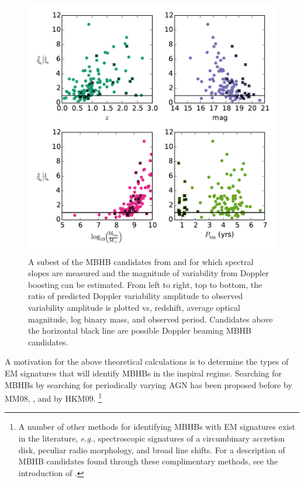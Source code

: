 \begin{figure}
\begin{center}
\includegraphics[scale=0.55]{figures/ch0/PTF_xsiGtr1_vs_z_M_P_alph_I90} 
\end{center}
\caption{A subest of the MBHB candidates from \citep{Graham+2015b} and \citep[][denoted by black x's]{Charisi+2016} for which spectral slopes are measured and the magnitude of variability from Doppler boosting can be estimated. From left to right, top to bottom, the ratio of predicted Doppler variability amplitude to observed variability amplitude is plotted vs, redshift, average optical magnitude, log binary mass, and observed period. Candidates above the horizontal black line are possible Doppler beaming MBHB candidates.}
\label{Fig:DopCan}
\end{figure}


A motivation for the above theoretical calculations is to
determine the types of EM signatures that will identify MBHBs in the inspiral
regime. Searching for MBHBs by searching for periodically varying AGN has been
proposed before by MM08, \cite{Haiman+2009}, and by HKM09. \footnote{A number
of other methods for identifying MBHBs with EM signatures exist in the
literature, \emph{e.g.}, spectroscopic signatures of a circumbinary accretion
disk, peculiar radio morphology, and broad line shifts. For a description of
MBHB candidates found through these complimentary methods, see the
introduction of \cite{Charisi+2016}.}
 

